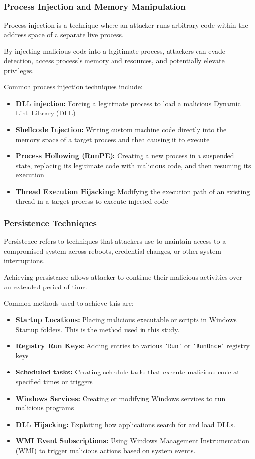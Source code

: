 \documentclass[11pt]{article}
\begin{document}
				\subsubsection{Process Injection and Memory Manipulation}
				Process injection is a technique where an attacker runs arbitrary code within the address space of a separate live process.\par
				By injecting malicious code into a legitimate process, attackers can evade detection, access process's memory and resources, and potentially elevate privileges.\par
				Common process injection techniques include:
				\begin{itemize}
					\item \textbf{DLL injection:} Forcing a legitimate process to load a malicious Dynamic Link Library (DLL)
					\item \textbf{Shellcode Injection:} Writing custom machine code directly into the memory space of a target process and then causing it to execute
					\item \textbf{Process Hollowing (RunPE):} Creating a new process in a suspended state, replacing its legitimate code with malicious code, and then resuming its execution
					\item \textbf{Thread Execution Hijacking:} Modifying the execution path of an existing thread in a target process to execute injected code
				\end{itemize}
				\subsubsection{Persistence Techniques}
				Persistence refers to techniques that attackers use to maintain access to a compromised system across reboots, credential changes, or other system interruptions.\par
				Achieving persistence allows attacker to continue their malicious activities over an extended period of time.\par
				Common methods used to achieve this are:
				\begin{itemize}
					\item \textbf{Startup Locations:} Placing malicious executable or scripts in Windows Startup folders. This is the method used in this study.
					\item \textbf{Registry Run Keys:} Adding entries to various \texttt{'Run'} or \texttt{'RunOnce'} registry keys
					\item \textbf{Scheduled tasks:} Creating schedule tasks that execute malicious code at specified times or triggers
					\item \textbf{Windows Services:} Creating or modifying Windows services to run malicious programs
					\item \textbf{DLL Hijacking:} Exploiting how applications search for and load DLLs.
					\item \textbf{WMI Event Subscriptions:} Using Windows Management Instrumentation (WMI) to trigger malicious actions based on system events.
				\end{itemize}
\end{document}
